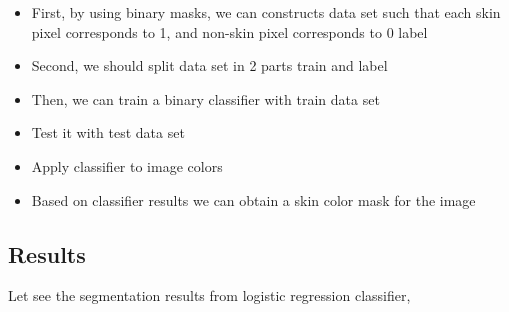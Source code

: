 \documentclass[11pt]{report}
\begin{document}
\begin{itemize}[label=]
\item First, by using binary masks, we can constructs data set such that each skin pixel corresponds to 1, and non-skin pixel corresponds to 0 label
\item Second, we should split data set in 2 parts train and label
\item Then, we can train a binary classifier with train data set
\item Test it with test data set
\item Apply classifier to image colors
\item Based on classifier results we can obtain a skin color mask for the image
\end{itemize}

\subsection{Results}

Let see the segmentation results from logistic regression classifier,
\end{document}
